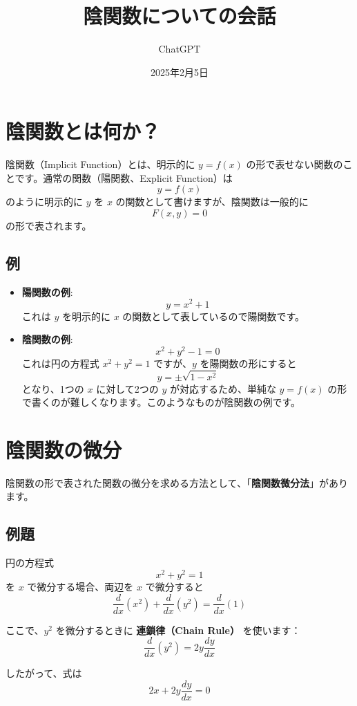 \documentclass{article}
\begin{document}
\title{陰関数についての会話}
\author{ChatGPT}
\date{2025年2月5日}
\maketitle

\section{陰関数とは何か？}

陰関数（Implicit Function）とは、明示的に $y = f(x)$ の形で表せない関数のことです。通常の関数（陽関数、Explicit Function）は
\[
y = f(x)
\]
のように明示的に $y$ を $x$ の関数として書けますが、陰関数は一般的に
\[
F(x, y) = 0
\]
の形で表されます。

\subsection{例}
\begin{itemize}
    \item \textbf{陽関数の例}:
    \[
    y = x^2 + 1
    \]
    これは $y$ を明示的に $x$ の関数として表しているので陽関数です。

    \item \textbf{陰関数の例}:
    \[
    x^2 + y^2 - 1 = 0
    \]
    これは円の方程式 $x^2 + y^2 = 1$ ですが、$y$ を陽関数の形にすると
    \[
    y = \pm \sqrt{1 - x^2}
    \]
    となり、1つの $x$ に対して2つの $y$ が対応するため、単純な $y = f(x)$ の形で書くのが難しくなります。このようなものが陰関数の例です。
\end{itemize}

\section{陰関数の微分}

陰関数の形で表された関数の微分を求める方法として、「\textbf{陰関数微分法}」があります。

\subsection{例題}
円の方程式
\[
x^2 + y^2 = 1
\]
を $x$ で微分する場合、両辺を $x$ で微分すると
\[
\frac{d}{dx} (x^2) + \frac{d}{dx} (y^2) = \frac{d}{dx} (1)
\]

ここで、$y^2$ を微分するときに \textbf{連鎖律（Chain Rule）} を使います：
\[
\frac{d}{dx} (y^2) = 2y \frac{dy}{dx}
\]

したがって、式は
\[
2x + 2y \frac{dy}{dx} = 0
\]
\end{document}
